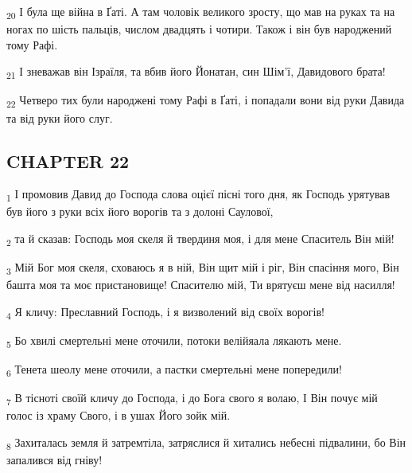 \begin{tcolorbox}
\textsubscript{20} І була ще війна в Ґаті. А там чоловік великого зросту, що мав на руках та на ногах по шість пальців, числом двадцять і чотири. Також і він був народжений тому Рафі.
\end{tcolorbox}
\begin{tcolorbox}
\textsubscript{21} І зневажав він Ізраїля, та вбив його Йонатан, син Шім'ї, Давидового брата!
\end{tcolorbox}
\begin{tcolorbox}
\textsubscript{22} Четверо тих були народжені тому Рафі в Ґаті, і попадали вони від руки Давида та від руки його слуг.
\end{tcolorbox}
\subsection{CHAPTER 22}
\begin{tcolorbox}
\textsubscript{1} І промовив Давид до Господа слова оцієї пісні того дня, як Господь урятував був його з руки всіх його ворогів та з долоні Саулової,
\end{tcolorbox}
\begin{tcolorbox}
\textsubscript{2} та й сказав: Господь моя скеля й твердиня моя, і для мене Спаситель Він мій!
\end{tcolorbox}
\begin{tcolorbox}
\textsubscript{3} Мій Бог моя скеля, сховаюсь я в ній, Він щит мій і ріг, Він спасіння мого, Він башта моя та моє пристановище! Спасителю мій, Ти врятуєш мене від насилля!
\end{tcolorbox}
\begin{tcolorbox}
\textsubscript{4} Я кличу: Преславний Господь, і я визволений від своїх ворогів!
\end{tcolorbox}
\begin{tcolorbox}
\textsubscript{5} Бо хвилі смертельні мене оточили, потоки велійяала лякають мене.
\end{tcolorbox}
\begin{tcolorbox}
\textsubscript{6} Тенета шеолу мене оточили, а пастки смертельні мене попередили!
\end{tcolorbox}
\begin{tcolorbox}
\textsubscript{7} В тісноті своїй кличу до Господа, і до Бога свого я волаю, І Він почує мій голос із храму Свого, і в ушах Його зойк мій.
\end{tcolorbox}
\begin{tcolorbox}
\textsubscript{8} Захиталась земля й затремтіла, затряслися й хитались небесні підвалини, бо Він запалився від гніву!
\end{tcolorbox}
